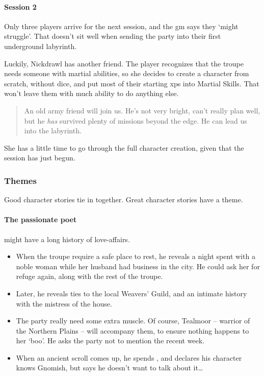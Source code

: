 \begin{multicols}{2}
\begin{exampletext}
\end{exampletext}

\begin{exampletext}
  \paragraph{Session 2}
  Only three players arrive for the next session, and the \gls{gm} says they `might struggle'.
  That doesn't sit well when sending the party into their first underground labyrinth.

  Luckily, Nickdrawl has another friend.
  The player recognizes that the troupe needs someone with martial abilities, so she decides to create a character from scratch, without dice, and put most of their starting \glspl{xp} into Martial Skills.
  That won't leave them with much ability to do anything else.

  \begin{quotation}
    An old army friend will join us.
    He's not very bright, can't really plan well, but he \emph{has} survived plenty of missions beyond the \gls{edge}.
    He can lead us into the labyrinth.
  \end{quotation}

  She has a little time to go through the full character creation, given that the session has just begun.
\end{exampletext}

\subsubsection{Themes}

Good character stories tie in together.
Great character stories have a theme.

\paragraph{The passionate poet}
might have a long history of love-affairs.

\begin{itemize}
  \item
  When the troupe require a safe place to rest, he reveals a night spent with a noble woman while her husband had business in the city.
  He could ask her for refuge again, along with the rest of the troupe.
  \item
  Later, he reveals ties to the local Weavers' Guild, and an intimate history with the mistress of the house.
  \item
  The party really need some extra muscle.
  Of course, Tealmoor -- warrior of the Northern Plains -- will accompany them, to ensure nothing happens to her `boo'.
  He asks the party not to mention the recent week.
  \item
  When an ancient scroll comes up, he spends , and declares his character knows Gnomish, but says he doesn't want to talk about it\ldots
\end{itemize}


\end{multicols}
